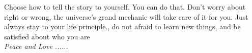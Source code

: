 \documentclass[a6paper,9pt,landscape]{texMemo} %
\begin{document}
\maketitle %
\thispagestyle{empty} %
 Choose how to tell the story to yourself. You can do that. Don't worry about right or wrong, the universe's grand mechanic will take care of it for you. Just always stay to your life principle., do not afraid to learn new things, and be satisfied about who you are \\

\textit{Peace and Love ......}
\end{document}

